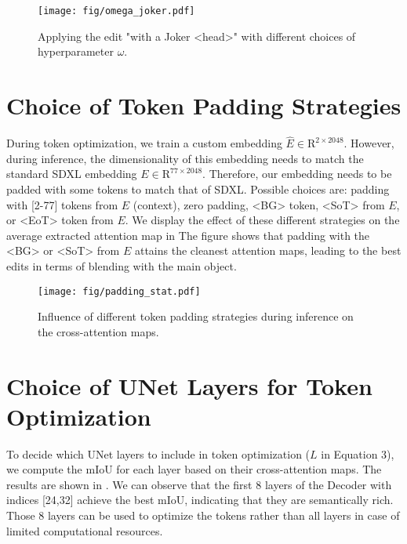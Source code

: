 \begin{figure*}
    \centering
    \texttt{[image: fig/omega\_joker.pdf]}
    \caption{Applying the edit "with a Joker <head>" with different choices of hyperparameter $\omega$.}
    \label{fig:omega}
\end{figure*}



\section{Choice of Token Padding Strategies}
\label{sec:padding_strategy}
During token optimization, we train a custom embedding $\hat{E} \in \mathrm{R}^{2 \times 2048}$.
However, during inference, the dimensionality of this embedding needs to match the standard SDXL embedding $E \in \mathrm{R}^{77 \times 2048}$.
Therefore, our embedding needs to be padded with some tokens to match that of SDXL.
Possible choices are: padding with [2-77] tokens from $E$ (context), zero padding, <BG> token, <SoT> from $E$, or <EoT> token from $E$.
We display the effect of these different strategies on the average extracted attention map in 
The figure shows that padding with the <BG> or <SoT> from $E$ attains the cleanest attention maps, leading to the best edits in terms of blending with the main object.

\begin{figure*}
    \centering
    \texttt{[image: fig/padding\_stat.pdf]}
    \caption{Influence of different token padding strategies during inference on the cross-attention maps.}
    \label{fig:padding}
\end{figure*}


\section{Choice of UNet Layers for Token Optimization}
\label{sec:choice_unet_layers}
To decide which UNet layers to include in token optimization ($L$ in Equation 3), we compute the mIoU for each layer based on their cross-attention maps.
The results are shown in .
We can observe that the first 8 layers of the Decoder with indices [24,32] achieve the best mIoU, indicating that they are semantically rich.
Those 8 layers can be used to optimize the tokens rather than all layers in case of limited computational resources.


